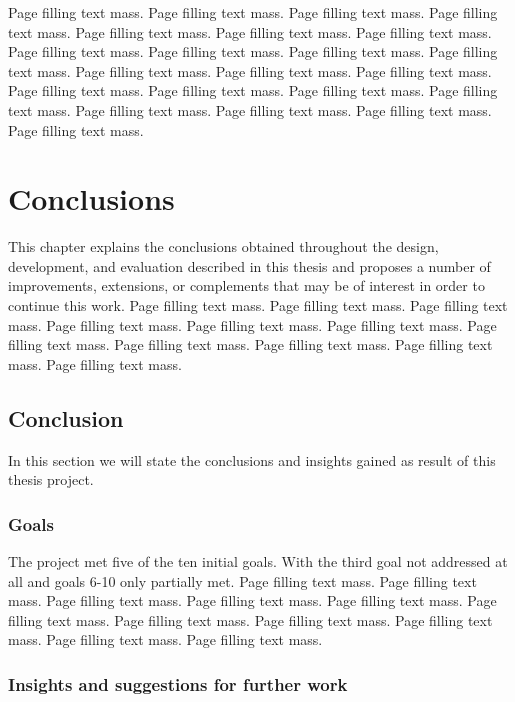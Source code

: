\documentclass[12pt,a4paper,twoside,openright]{book}
\begin{document}
Page filling text mass. Page filling text mass. Page filling text mass. Page filling text mass. Page filling text mass. Page filling text mass. Page filling text mass. Page filling text mass. Page filling text mass. Page filling text mass. Page filling text mass. Page filling text mass. Page filling text mass. Page filling text mass. Page filling text mass. Page filling text mass. Page filling text mass. Page filling text mass. Page filling text mass. Page filling text mass. Page filling text mass. Page filling text mass.

\chapter{Conclusions}
\label{chap:conclusion}

This chapter explains the conclusions obtained throughout the design,
development, and evaluation described in this thesis and proposes a number of
improvements, extensions, or complements that may be of interest in order to
continue this work. Page filling text mass. Page filling text mass. Page
filling text mass. Page filling text mass. Page filling text mass. Page
filling text mass. Page filling text mass. Page filling text mass. Page
filling text mass. Page filling text mass. Page filling text mass.

\section{Conclusion}


In this section we will state the conclusions and insights gained as result of this thesis project.

\subsection{Goals}
\label{ssec:goals}

The project met five of the ten initial goals. With the third goal not
addressed at all and goals 6-10 only partially met. Page filling text
mass. Page filling text mass. Page filling text mass. Page filling text
mass. Page filling text mass. Page filling text mass. Page filling text
mass. Page filling text mass. Page filling text mass. Page filling text
mass. Page filling text mass.


\subsection{Insights and suggestions for further work}
\label{ssec:insights-and-suggestions}
\end{document}

